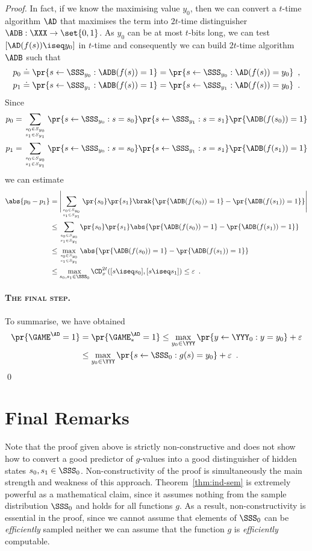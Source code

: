 \documentclass{llncs}
\begin{document}
\begin{proof}
In fact, if we know the maximising value $y_0$, then we can convert a
$t$-time algorithm $\AD$ that maximises the term into $2t$-time
distinguisher $\ADB:\XXX\to\set{0,1}$. As $y_0$ can be at most
$t$-bits long, we can test $[\AD(f(s))\iseq y_0]$ in $t$-time and
consequently we can build $2t$-time algorithm $\ADB$ such that
\begin{align*}
  &p_0\doteq \pr{s\gets\SSS_{y_0}:\ADB(f(s))=1}=\pr{s\gets\SSS_{y_0}:
    \AD(f(s))=y_0}\enspace,\\
  &p_1\doteq\pr{s\gets\SSS_{y_1}:\ADB(f(s))=1}=\pr{s\gets\SSS_{y_1}:
    \AD(f(s))=y_0}\enspace.
\end{align*}
Since
\begin{align*}
  p_0%
  &=\sum_{s_0\in S_{y_0}\atop s_1\in S_{y_1}}\pr{s\gets\SSS_{y_0}:s=s_0}\pr{s\gets\SSS_{y_1}:s=s_1}\pr{\ADB(f(s_0))=1}\\
  p_1 %
  &=\sum_{s_0\in S_{y_0}\atop s_1\in
    S_{y_1}}\pr{s\gets\SSS_{y_0}:s=s_0}\pr{s\gets\SSS_{y_1}:s=s_1}\pr{\ADB(f(s_1))=1}
\end{align*}
we can estimate
\begin{align*}
  \abs{p_0-p_1}
  &=\Biggl|\sum_{s_0\in S_{y_0}\atop s_1\in S_{y_1}}\pr{s_0}\pr{s_1}\brak{\pr{\ADB(f(s_0))=1}-\pr{\ADB(f(s_1))=1}}\Biggr|\\
  &\leq\sum_{s_0\in S_{y_0}\atop s_1\in S_{y_1}}\pr{s_0}\pr{s_1}\abs{\pr{\ADB(f(s_0))=1}-\pr{\ADB(f(s_1))=1}}\\
  &\leq\max_{s_0\in S_{y_0}\atop s_1\in S_{y_1}}\abs{\pr{\ADB(f(s_0))=1}-\pr{\ADB(f(s_1))=1}}\\
  &\leq\max_{s_0,s_1\in\SSS_0}\CD_x^{2t}([s\iseq s_0],[s\iseq s_1])\leq \varepsilon\enspace.
\end{align*}

\paragraph{\textsc{The final step}.}
To summarise, we have obtained
\begin{align*}
  \pr{\GAME^\AD=1}&=\pr{\GAME_*^\AD=1}\leq \max_{y_0\in\YYY}\pr{y\gets\YYY_0:y=y_0}+\varepsilon\\
  &\leq\max_{y_0\in\YYY}\pr{s\gets \SSS_0:g(s)=y_0}+\varepsilon\enspace. 
\end{align*}
\qed
\end{proof}

\section{Final Remarks}
Note that the proof given above is strictly non-constructive and does
not show how to convert a good predictor of $g$-values into a good
distinguisher of hidden states $s_0,s_1\in\SSS_0$. Non-constructivity
of the proof is simultaneously the main strength and weakness of this
approach. Theorem~\ref{thm:ind-sem} is extremely powerful as a
mathematical claim, since it assumes nothing from the sample
distribution $\SSS_0$ and holds for all functions $g$. As a result,
non-constructivity is essential in the proof, since we cannot assume
that elements of $\SSS_0$ can be \emph{efficiently} sampled neither we
can assume that the function $g$ is \emph{efficiently} computable.
\end{document}
